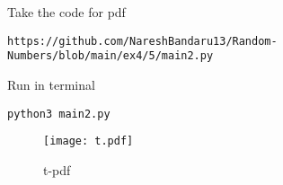 \documentclass[journal,12pt,twocolumn]{IEEEtran}
\renewcommand\thesection{\arabic{section}}
\begin{document}
\begin{enumerate}[label=\thesection.\arabic*
,ref=\thesection.\theenumi]
Take the code for pdf
\begin{lstlisting}
https://github.com/NareshBandaru13/Random-Numbers/blob/main/ex4/5/main2.py
\end{lstlisting}
Run in terminal
\begin{lstlisting}
python3 main2.py
\end{lstlisting}
\begin{figure}[H]
    \centering
    \texttt{[image: t.pdf]}
    \caption{t-pdf}
    \label{fig:t-pdf}
\end{figure}

\end{enumerate}
\end{document}
